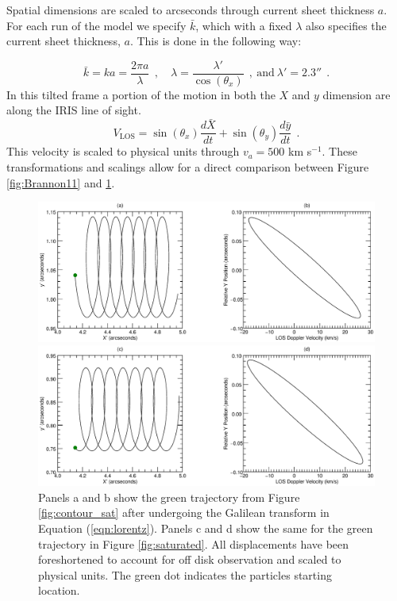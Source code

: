 Spatial dimensions are scaled to arcseconds through current sheet thickness $a$.  For each run of the model we specify $\bar{k}$, which with a fixed $\lambda$ also specifies the current sheet thickness, $a$. This is done in the following way:
	
	\begin{equation}
		\bar{k} = ka = \frac{2\pi a}{\lambda}~~, \quad \lambda = \frac{\lambda'}{\cos(\theta_x)}~~,~\mathrm{and}~\lambda'=2.3''~~.
	\end{equation}
In this tilted frame a portion of the motion in both the $X$ and $y$ dimension are along the IRIS line of sight.
	\begin{equation}
		V_{\mathrm{LOS}} = \sin(\theta_x)\frac{d\bar{X}}{dt} + \sin(\theta_y)\frac{d\bar{y}}{dt}~~.
	\end{equation}
This velocity is scaled to physical units through $v_a = 500$ km s$^{-1}$. These transformations and scalings allow for a direct comparison between Figure \ref{fig:Brannon11} and \ref{fig:traj}.  

\begin{figure}[htbp]
	\caption{Panels a and b show the green trajectory from Figure \ref{fig:contour_sat} after undergoing the Galilean transform in Equation (\ref{eqn:lorentz}). Panels c and d show the same for the green trajectory in Figure \ref{fig:saturated}. All displacements have been foreshortened to account for off disk observation and scaled to physical units.   The green dot indicates the particles starting location.}
	\label{fig:traj}
	\centerline{\includegraphics[scale=.45]{ParkerLongcope2017/trajectory.eps}}
	\centerline{\includegraphics[scale=.45]{ParkerLongcope2017/Ref_Response_1b.eps}}
\end{figure}

